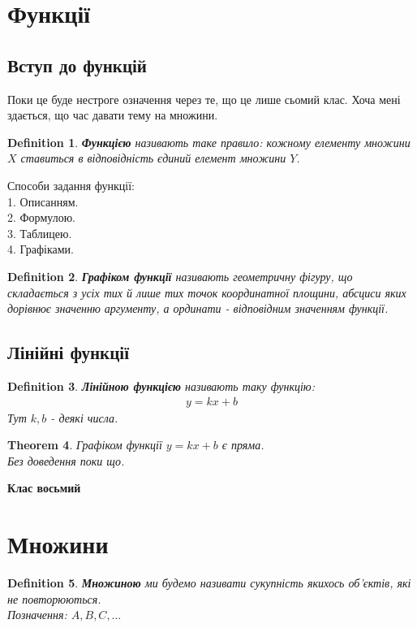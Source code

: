 \documentclass[a4paper, 10pt]{article}
\theoremstyle{theoremdd}
\newtheorem{theorem}{Theorem}[subsection]
\theoremstyle{theoremdd}
\newtheorem{definition}[theorem]{Definition}
\theoremstyle{theoremdd}
\theoremstyle{theoremdd}
\theoremstyle{theoremdd}
\theoremstyle{theoremdd}
\theoremstyle{theoremdd}
\theoremstyle{theoremdd}
\begin{document}
\section{Функції}
\subsection{Вступ до функцій}
Поки це буде нестроге означення через те, що це лише сьомий клас. Хоча мені здається, що час давати тему на множини.

\begin{definition}
\textbf{Функцією} називають таке правило: кожному елементу множини $X$ ставиться в відповідність єдиний елемент множини $Y$.
\end{definition}
Способи задання функції:\\
1. Описанням.\\
2. Формулою.\\
3. Таблицею.\\
4. Графіками.

\begin{definition}
\textbf{Графіком функції} називають геометричну фігуру, що складається з усіх тих й лише тих точок координатної площини, абсциси яких дорівнює значенню аргументу, а ординати - відповідним значенням функції.
\end{definition}

\subsection{Лінійні функції}
\begin{definition}
\textbf{Лінійною функцією} називають таку функцію:
\begin{align*}
y = kx+b
\end{align*}
Тут $k,b$ - деякі числа.
\end{definition}

\begin{theorem}
Графіком функції $y = kx + b$ є пряма.\\
\textit{Без доведення поки що.}
\end{theorem}
\newpage

{\Huge \textbf{Клас восьмий}}
\section{Множини}
\begin{definition}
\textbf{Множиною} ми будемо називати сукупність якихось об'єктів, які не повторюються.\\
Позначення: $A,B,C, \dots$
\end{definition}
\end{document}

